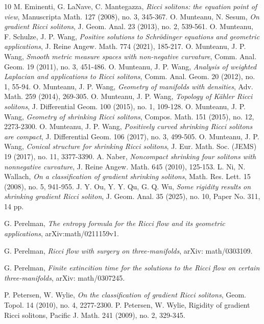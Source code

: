 \documentclass[a4, 12pt]{amsart}
\theoremstyle{plain}
\begin{document}
\begin{thebibliography}{10}
	M. Eminenti, G. LaNave, C. Mantegazza,  {\em Ricci solitons: the equation point of view}, Manuscripta Math. 127 (2008), no. 3, 345-367.
	O. Munteanu, N. Sesum, {\em On gradient Ricci solitons}, J. Geom. Anal. 23 (2013), no. 2, 539-561.
	O. Munteanu, F. Schulze, J. P. Wang, {\em Positive solutions to Schr\"odinger equations and geometric applications}, J. Reine Angew. Math.  774  (2021), 185-217.
	O. Munteanu, J. P. Wang, {\em  Smooth metric measure spaces with non-negative curvature}, Comm. Anal. Geom. 19 (2011), no. 3, 451-486.
	O. Munteanu, J. P. Wang, {\em Analysis of weighted Laplacian and applications to Ricci solitons}, Comm. Anal. Geom. 20 (2012), no. 1, 55-94.
	O. Munteanu, J. P. Wang, {\em Geometry of manifolds with densities}, Adv. Math. 259 (2014), 269-305.
	O. Munteanu, J. P. Wang, {\em Topology of K\"ahler Ricci solitons}, J. Differential Geom. 100 (2015), no. 1, 109-128.
	O. Munteanu, J. P. Wang, {\em Geometry of shrinking Ricci solitons}, Compos. Math. 151 (2015), no. 12, 2273-2300.
	O. Munteanu, J. P. Wang, {\em Positively curved shrinking Ricci solitons are compact}, J. Differential Geom. 106 (2017), no. 3, 499-505.
	O. Munteanu, J. P. Wang, {\em Conical structure for shrinking Ricci solitons}, J. Eur. Math. Soc. (JEMS) 19 (2017), no. 11, 3377-3390.
	A. Naber, {\em  Noncompact shrinking four solitons with nonnegative curvature}, J. Reine Angew. Math. 645 (2010), 125-153.
	L. Ni, N. Wallach, {\em On a classification of gradient shrinking solitons}, Math. Res. Lett. 15 (2008), no. 5, 941-955.
	J. Y. Ou, Y. Y. Qu, G. Q. Wu, {\em Some rigidity results on shrinking gradient Ricci soliton}, J. Geom. Anal. 35 (2025), no. 10, Paper No. 311, 14 pp.
	
	G. Perelman,  {\em The entropy formula for the Ricci flow and its geometric applications}, arXiv:math/0211159v1.
	
	G. Perelman,  {\em Ricci flow with surgery on three-manifolds}, arXiv: math/0303109.
	
	G. Perelman,  {\em Finite extincition time for the solutions to the Ricci flow on certain three-manifolds}, arXiv: math/0307245.
	
	P. Petersen, W. Wylie, {\em On the classification of gradient Ricci solitons}, Geom. Topol. 14 (2010), no. 4, 2277-2300.
	P. Petersen, W. Wylie,   Rigidity of gradient Ricci solitons, Pacific J. Math. 241 (2009), no. 2, 329-345.
	

\end{thebibliography}
\end{document}
